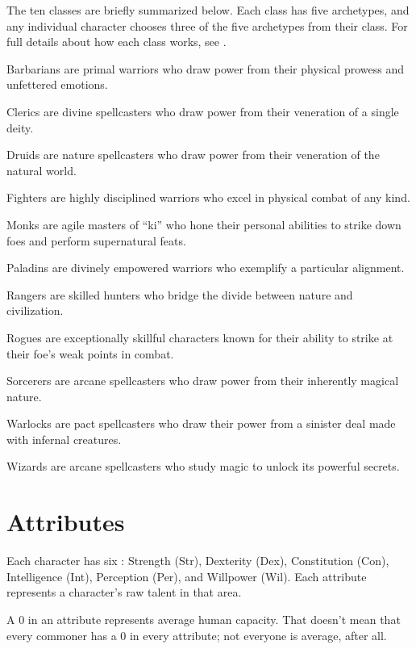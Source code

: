     The ten classes are briefly summarized below.
    Each class has five archetypes, and any individual character chooses three of the five archetypes from their class.
    For full details about how each class works, see .
    \begin{raggeditemize}
        \item Barbarians are primal warriors who draw power from their physical prowess and unfettered emotions.
        \item Clerics are divine spellcasters who draw power from their veneration of a single deity.
        \item Druids are nature spellcasters who draw power from their veneration of the natural world.
        \item Fighters are highly disciplined warriors who excel in physical combat of any kind.
        \item Monks are agile masters of ``ki'' who hone their personal abilities to strike down foes and perform supernatural feats.
        \item Paladins are divinely empowered warriors who exemplify a particular alignment.
        \item Rangers are skilled hunters who bridge the divide between nature and civilization.
        \item Rogues are exceptionally skillful characters known for their ability to strike at their foe's weak points in combat.
        \item Sorcerers are arcane spellcasters who draw power from their inherently magical nature.
        \item Warlocks are pact spellcasters who draw their power from a sinister deal made with infernal creatures.
        \item Wizards are arcane spellcasters who study magic to unlock its powerful secrets.
    \end{raggeditemize}

\section{Attributes}\label{Attributes}

    Each character has six : Strength (Str), Dexterity (Dex), Constitution (Con), Intelligence (Int), Perception (Per), and Willpower (Wil).
    Each attribute represents a character's raw talent in that area.

    A 0 in an attribute represents average human capacity.
    That doesn't mean that every commoner has a 0 in every attribute; not everyone is average, after all.

